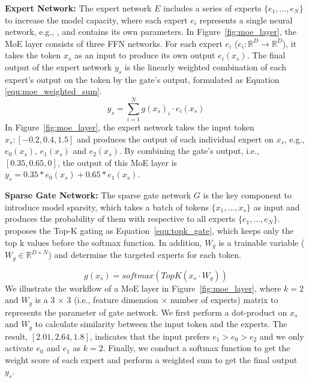 \textbf{Expert Network:} 
The expert network $E$ includes a series of experts $\{e_{1},...,e_{N}\}$ to increase the model capacity, where each expert $e_{i}$ represents a single neural network, e.g., , and contains its own parameters. In Figure~\ref{fig:moe_layer}, the MoE layer consists of three FFN networks. 
For each expert $e_{i}$ ($e_{i}: \mathbb{R}^{D} \rightarrow \mathbb{R}^{D}$), it takes the token $x_{s}$ as an input to produce its own output $e_{i}(x_{s})$. The final output of the expert network $y_{s}$ is the linearly weighted combination of each expert’s output on the token by the gate's output, formulated as Equation \ref{equ:moe_weighted_sum}. 
\begin{equation}
    y_{s} = \sum_{i=1}^{N}g(x_{s})_{i} \cdot e_{i}(x_{s})
\label{equ:moe_weighted_sum}
\end{equation}
\noindent In Figure~\ref{fig:moe_layer}, the expert network takes the input token $x_{s}: [-0.2, 0.4, 1.5]$ and produces the output of each individual expert on $x_s$, e.g., $e_{0}(x_s)$, $e_{1}(x_s)$ and $e_{2}(x_s)$. By combining the gate's output, i.e., $[0.35, 0.65, 0]$, the output of this MoE layer is $y_s = 0.35*e_{0}(x_s) + 0.65*e_{1}(x_s)$.

\textbf{Sparse Gate Network:}
The sparse gate network $G$ is the key component to introduce model sparsity, which takes a batch of tokens $\{x_{1},...,x_{s}\}$ as input and produces the probability of them with respective to all experts $\{e_{1},...,e_{N}\}$.
\citet{DBLP:lstm_moe} proposes the Top-K gating as Equation~\ref{equ:topk_gate}, which keeps only the top k values before the softmax function. In addition, $W_{g}$ is a trainable variable ($W_{g} \in \mathbb{R}^{D \times N}$) and determine the targeted experts for each token.

\begin{equation}
    g(x_s) = softmax(TopK(x_{s} \cdot W_{g}) )
\label{equ:topk_gate}
\end{equation}
\noindent We illustrate the workflow of a MoE layer in Figure~\ref{fig:moe_layer}, where $k=2$ and $W_g$ is a 3 $\times$ 3 (i.e., feature dimension $\times$ number of experts) matrix to represents the parameter of gate network. We first perform a dot-product on $x_s$ and $W_g$ to calculate similarity between the input token and the experts. The result, $[2.01, 2.64, 1.8]$, indicates that the input prefers $e_1 > e_0 > e_2$ and we only activate $e_0$ and $e_1$ as $k = 2$. Finally, we conduct a softmax function to get the weight score of each expert and perform a weighted sum to get the final output $y_s$. 

